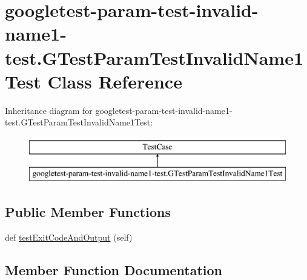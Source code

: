\hypertarget{classgoogletest-param-test-invalid-name1-test_1_1_g_test_param_test_invalid_name1_test}{}\section{googletest-\/param-\/test-\/invalid-\/name1-\/test.G\+Test\+Param\+Test\+Invalid\+Name1\+Test Class Reference}
\label{classgoogletest-param-test-invalid-name1-test_1_1_g_test_param_test_invalid_name1_test}
Inheritance diagram for googletest-\/param-\/test-\/invalid-\/name1-\/test.G\+Test\+Param\+Test\+Invalid\+Name1\+Test\+:\begin{figure}[H]
\begin{center}
\leavevmode
\includegraphics[height=2.000000cm]{d5/daa/classgoogletest-param-test-invalid-name1-test_1_1_g_test_param_test_invalid_name1_test}
\end{center}
\end{figure}
\subsection*{Public Member Functions}
\begin{DoxyCompactItemize}
\item 
def \mbox{\hyperlink{classgoogletest-param-test-invalid-name1-test_1_1_g_test_param_test_invalid_name1_test_a2b7024a50e0b3b0fe9b0c6d28e470681}{test\+Exit\+Code\+And\+Output}} (self)
\end{DoxyCompactItemize}


\subsection{Member Function Documentation}
\mbox{\label{classgoogletest-param-test-invalid-name1-test_1_1_g_test_param_test_invalid_name1_test_a2b7024a50e0b3b0fe9b0c6d28e470681}} 
